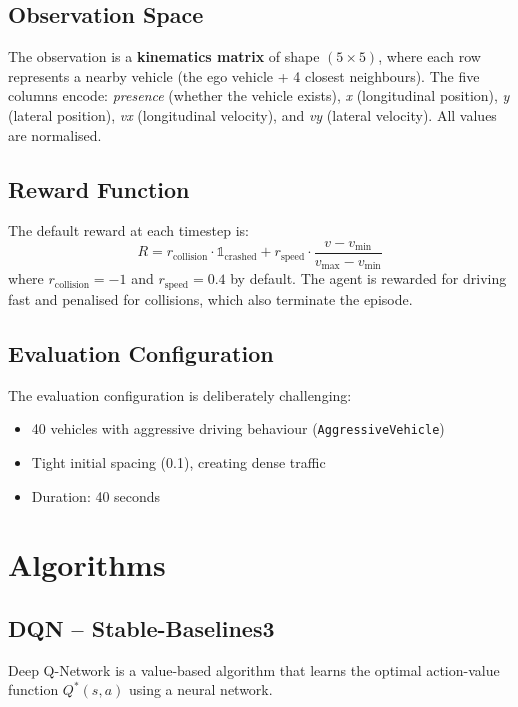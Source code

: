 \documentclass[11pt,a4paper]{article}
\begin{document}
\subsection{Observation Space}

The observation is a \textbf{kinematics matrix} of shape $(5 \times 5)$, where each row represents a nearby vehicle (the ego vehicle + 4 closest neighbours). The five columns encode: \textit{presence} (whether the vehicle exists), \textit{x} (longitudinal position), \textit{y} (lateral position), \textit{vx} (longitudinal velocity), and \textit{vy} (lateral velocity). All values are normalised.

\subsection{Reward Function}

The default reward at each timestep is:
\[
R = r_{\text{collision}} \cdot \mathbb{1}_{\text{crashed}} + r_{\text{speed}} \cdot \frac{v - v_{\min}}{v_{\max} - v_{\min}}
\]
where $r_{\text{collision}} = -1$ and $r_{\text{speed}} = 0.4$ by default. The agent is rewarded for driving fast and penalised for collisions, which also terminate the episode.

\subsection{Evaluation Configuration}

The evaluation configuration is deliberately challenging:
\begin{itemize}[nosep]
    \item 40 vehicles with aggressive driving behaviour (\texttt{AggressiveVehicle})
    \item Tight initial spacing (0.1), creating dense traffic
    \item Duration: 40 seconds
\end{itemize}

\section{Algorithms}

\subsection{DQN -- Stable-Baselines3}

Deep Q-Network \cite{mnih2015} is a value-based algorithm that learns the optimal action-value function $Q^*(s, a)$ using a neural network.
\end{document}
